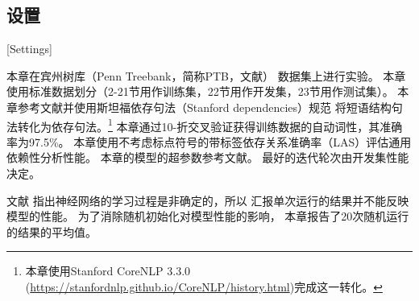 \subsection{设置}[Settings]

本章在宾州树库（Penn Treebank，简称PTB，文献）
数据集上进行实验。
本章使用标准数据划分（2-21节用作训练集，22节用作开发集，23节用作测试集）。
本章参考文献\cite{dyer-EtAl:2015:ACL-IJCNLP}并使用斯坦福依存句法（Stanford dependencies）规范
将短语结构句法转化为依存句法。\footnote{本章使用Stanford CoreNLP 3.3.0 (\url{https://stanfordnlp.github.io/CoreNLP/history.html})完成这一转化。}
本章通过10-折交叉验证获得训练数据的自动词性，其准确率为97.5\%。
本章使用不考虑标点符号的带标签依存关系准确率（LAS）评估通用依赖性分析性能。
本章的模型的超参数参考文献。
最好的迭代轮次由开发集性能决定。

文献
指出神经网络的学习过程是非确定的，所以
汇报单次运行的结果并不能反映模型的性能。
为了消除随机初始化对模型性能的影响，
本章报告了20次随机运行的结果的平均值。

%
%

